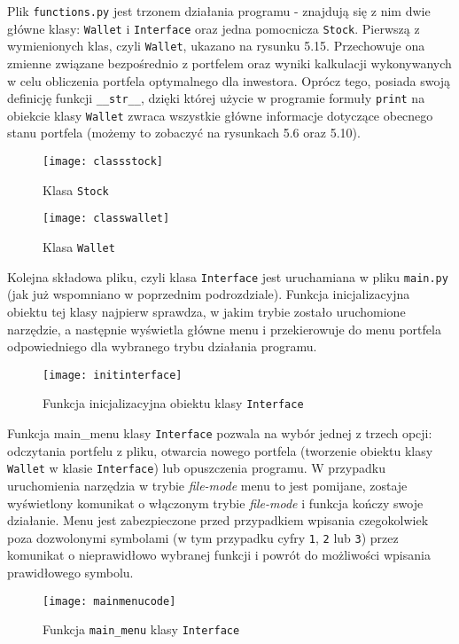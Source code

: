\documentclass[magister]{dyplom}
\def\code#1{\texttt{#1}}
\begin{document}
Plik \code{functions.py} jest trzonem działania programu - znajdują się z nim dwie główne klasy: \code{Wallet} i \code{Interface} oraz jedna pomocnicza \code{Stock}.
Pierwszą z wymienionych klas, czyli \code{Wallet}, ukazano na rysunku 5.15. Przechowuje ona zmienne związane bezpośrednio z portfelem oraz wyniki kalkulacji wykonywanych w celu obliczenia portfela optymalnego dla inwestora. Oprócz tego, posiada swoją definicję funkcji \code{\_\_str\_\_}, dzięki której użycie w programie formuły \code{print} na obiekcie klasy \code{Wallet} zwraca wszystkie główne informacje dotyczące obecnego stanu portfela (możemy to zobaczyć na rysunkach 5.6 oraz 5.10).

\begin{figure}[ht]
	\centering
	\texttt{[image: classstock]}
	\caption{Klasa \code{Stock}}
\end{figure}

\begin{figure}[ht]
	\centering
	\texttt{[image: classwallet]}
	\caption{Klasa \code{Wallet}}
\end{figure}

Kolejna składowa pliku, czyli klasa \code{Interface} jest uruchamiana w pliku \code{main.py} (jak już wspomniano w poprzednim podrozdziale). Funkcja inicjalizacyjna obiektu tej klasy najpierw sprawdza, w jakim trybie zostało uruchomione narzędzie, a następnie wyświetla główne menu i przekierowuje do menu portfela odpowiedniego dla wybranego trybu działania programu.

\begin{figure}[ht]
	\centering
	\texttt{[image: initinterface]}
	\caption{Funkcja inicjalizacyjna obiektu klasy \code{Interface}}
\end{figure}

Funkcja main\_menu klasy \code{Interface} pozwala na wybór jednej z trzech opcji: odczytania portfelu z pliku, otwarcia nowego portfela (tworzenie obiektu klasy \code{Wallet} w klasie \code{Interface}) lub opuszczenia programu. W przypadku uruchomienia narzędzia w trybie \textit{file-mode} menu to jest pomijane, zostaje wyświetlony komunikat o włączonym trybie \textit{file-mode} i funkcja kończy swoje działanie. Menu jest zabezpieczone przed przypadkiem wpisania czegokolwiek poza dozwolonymi symbolami (w tym przypadku cyfry \code{1}, \code{2} lub \code{3}) przez komunikat o nieprawidłowo wybranej funkcji i powrót do możliwości wpisania prawidłowego symbolu.

\begin{figure}[ht]
	\centering
	\texttt{[image: mainmenucode]}
	\caption{Funkcja \code{main\_menu} klasy \code{Interface}}
\end{figure}
\end{document}
